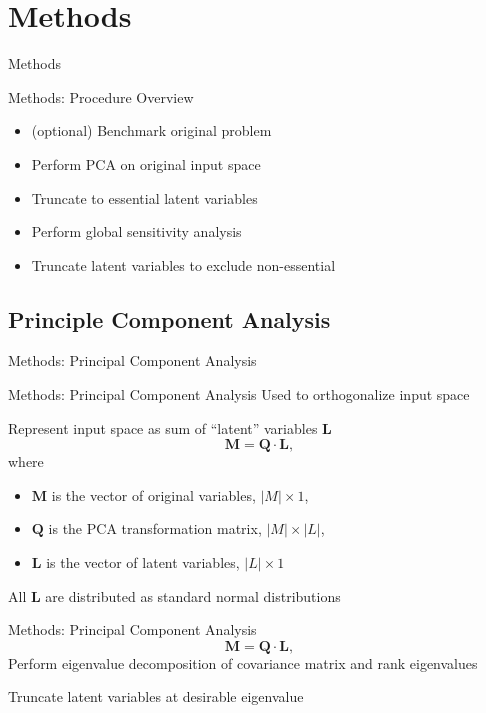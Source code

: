 \documentclass[t,9pt,svgnames]{beamer}
\begin{document}
\section{Methods}
\begin{frame}{Methods}
\end{frame}

\begin{frame}{Methods: Procedure Overview}
  \begin{itemize}
    \item (optional) Benchmark original problem
    \item Perform PCA on original input space
    \item Truncate to essential latent variables
    \item Perform global sensitivity analysis
    \item Truncate latent variables to exclude non-essential
  \end{itemize}
\end{frame}

\subsection{Principle Component Analysis}
\begin{frame}{Methods: Principal Component Analysis}
\end{frame}

\begin{frame}{Methods: Principal Component Analysis}
  Used to orthogonalize input space

  Represent input space as sum of ``latent'' variables $\bm{L}$
  \begin{equation}
    \bm{M} = \bm{Q} \cdot \bm{L},
  \end{equation}
  where
  \begin{itemize}
    \item $\bm{M}$ is the vector of original variables, $|M|\times1$,
    \item $\bm{Q}$ is the PCA transformation matrix, $|M|\times |L|$,
    \item $\bm{L}$ is the vector of latent variables, $|L|\times 1$
  \end{itemize}
  All $\bm{L}$ are distributed as standard normal distributions
\end{frame}

\begin{frame}{Methods: Principal Component Analysis}
  \begin{equation}
    \bm{M} = \bm{Q} \cdot \bm{L},
  \end{equation}
  Perform eigenvalue decomposition of covariance matrix and rank eigenvalues

  Truncate latent variables at desirable eigenvalue
\end{frame}
\end{document}
